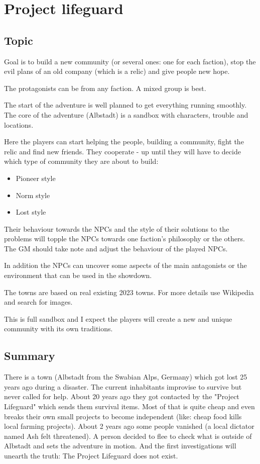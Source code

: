 \chapter{Project lifeguard}
\label{ch:project lifeguard}

\section{Topic}

Goal is to build a new community (or several ones: one for each faction), stop the evil plans of an old company (which is a relic) and give people new hope.

The protagonists can be from any faction. A mixed group is best.

The start of the adventure is well planned to get everything running smoothly. The core of the adventure (Albstadt) is a sandbox with characters, trouble and locations.

Here the players can start helping the people, building a community, fight the relic and find new friends. They cooperate - up until they will have to decide which type of community they are about to build:

\begin{itemize}
    \item Pioneer style
    \item Norm style
    \item Lost style
\end{itemize}

Their behaviour towards the NPCs and the style of their solutions to the problems will topple the NPCs towards one faction's philosophy or the others. The GM should take note and adjust the behaviour of the played NPCs.

In addition the NPCs can uncover some aspects of the main antagonists or the environment that can be used in the showdown.

The towns are based on real existing 2023 towns. For more details use Wikipedia and search for images.

This is full sandbox and I expect the players will create a new and unique community with its own traditions.

\section{Summary}

There is a town (Albstadt from the Swabian Alps, Germany) which got lost 25 years ago during a disaster. The current inhabitants improvise to survive but never called for help. About 20 years ago they got contacted by the "Project Lifeguard" which sends them survival items. Most of that is quite cheap and even breaks their own small projects to become independent (like: cheap food kills local farming projects). About 2 years ago some people vanished (a local dictator named Ash felt threatened). A person decided to flee to check what is outside of Albstadt and sets the adventure in motion. And the first investigations will unearth the truth: The Project Lifeguard does not exist.

